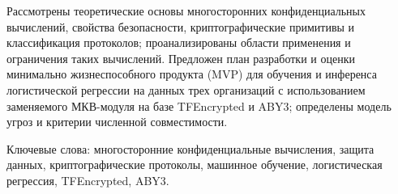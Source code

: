 \abstract %

Рассмотрены теоретические основы многосторонних конфиденциальных вычислений, свойства безопасности, криптографические примитивы и классификация протоколов; проанализированы области применения и ограничения таких вычислений. Предложен план разработки и оценки минимально жизнеспособного продукта (MVP) для обучения и инференса логистической регрессии на данных трех организаций с использованием заменяемого МКВ-модуля на базе TFEncrypted и ABY3; определены модель угроз и критерии численной совместимости.
 
Ключевые слова: многосторонние конфиденциальные вычисления, защита данных, криптографические протоколы, машинное обучение, логистическая регрессия, TFEncrypted, ABY3.